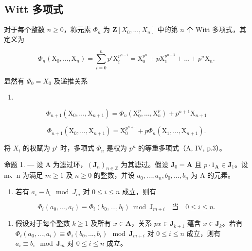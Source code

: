 \subsection{Witt 多项式}

  对于每个整数 \(n \geqslant 0\)，称元素 \(\Phi_n\) 为 \(\mathbf{Z}[X_0, ..., X_n]\) 中的第 \(n\) 个 Witt 多项式，其定义为

\[
\Phi_ {n} \left(\mathrm{X} _ {0}, \dots , \mathrm{X} _ {n}\right) = \sum_ {i = 0} ^ {n} p ^ {i} \mathrm{X} _ {i} ^ {p ^ {n - i}} = \mathrm{X} _ {0} ^ {p ^ {n}} + p \mathrm{X} _ {1} ^ {p ^ {n - 1}} + \dots + p ^ {n} \mathrm{X} _ {n}.\tag{1}
\]

显然有 \(\Phi_{0}=X_{0}\) 及递推关系

\begin{enumerate}
\def\labelenumi{(\arabic{enumi})}
\setcounter{enumi}{1}
\tightlist
\item
\end{enumerate}

\[
\Phi_ {n + 1} \left(\mathrm{X} _ {0}, \dots , \mathrm{X} _ {n + 1}\right) = \Phi_ {n} \left(\mathrm{X} _ {0} ^ {p}, \dots , \mathrm{X} _ {n} ^ {p}\right) + p ^ {n + 1} \mathrm{X} _ {n + 1}\tag{3}
\]

\[
\Phi_ {n + 1} \left(\mathrm{X} _ {0}, \dots , \mathrm{X} _ {n + 1}\right) = \mathrm{X} _ {0} ^ {p ^ {n + 1}} + p \Phi_ {n} \left(\mathrm{X} _ {1}, \dots , \mathrm{X} _ {n + 1}\right).
\]

将 \(X_{i}\) 的权赋为 \(p^{i}\) 时，多项式 \(\Phi_{n}\) 是权为 \(p^{n}\) 的等重多项式（A, IV, p.3）。

命题 1. --- 设 A 为滤过环，\((\mathbf{J}_n)_{n\in \mathbb{Z}}\) 为其滤过。假设 \(\mathbf{J}_0 = \mathbf{A}\) 且 \(p\cdot 1_{\mathbf{A}}\in \mathbf{J}_{1}\)。设 m、n 为满足 \(m\geqslant 1\) 及 \(n\geqslant 0\) 的整数，并设 \(a_0,\dots,a_n,b_0,\dots,b_n\) 为 A 的元素。

\begin{enumerate}
\def\labelenumi{\alph{enumi})}
\tightlist
\item
  若有 \(a_i \equiv b_i \mod J_m\) 对 \(0 \leqslant i \leqslant n\) 成立，则有
\end{enumerate}

\[
\Phi_ {i} (a _ {0}, \dots , a _ {i}) \equiv \Phi_ {i} (b _ {0}, \dots , b _ {i}) \bmod \mathrm{J} _ {m + i} \quad \text{当} \quad 0 \leqslant i \leqslant n.
\]

\begin{enumerate}
\def\labelenumi{\alph{enumi})}
\setcounter{enumi}{1}
\tightlist
\item
  假设对于每个整数 \(k \geqslant 1\) 及所有 \(x \in \mathbf{A}\)，关系 \(p x \in \mathbf{J}_{k+1}\) 蕴含 \(x \in \mathbf{J}_k\)。若有 \(\Phi_i(a_0, ..., a_i) \equiv \Phi_i(b_0, ..., b_i) \mod \mathbf{J}_{m+i}\) 对 \(0 \leqslant i \leqslant n\) 成立，则有 \(a_i \equiv b_i \mod \mathbf{J}_m\) 对 \(0 \leqslant i \leqslant n\) 成立。
\end{enumerate}


